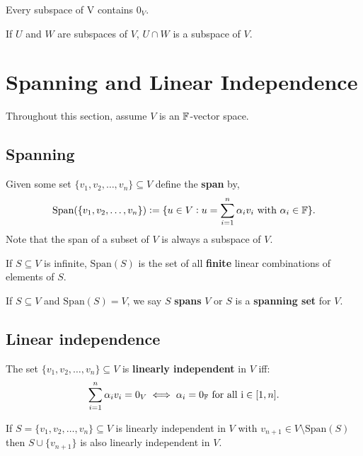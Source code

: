 \begin{theorem}
    Every subspace of V contains $0_V$.
\end{theorem}

\begin{theorem}
    If $U$ and $W$ are subspaces of $V$, $U\cap W$ is a subspace of $V$.
\end{theorem}

\section{Spanning and Linear Independence}
Throughout this section, assume $V$ is an $\mathbb{F}$-vector space.
\subsection{Spanning}
\begin{definition}[Span]
    Given some set $\{v_1,v_2,\ldots,v_n\}\subseteq V$ define the \textbf{span} by, \[
    \text{Span}(\{v_1,v_2,\ldots,v_n\}):=\{u\in V: u = \sum_{i=1}^n\alpha_i v_i \ \text{\textcolor{black}{ with }}\alpha_i\in\mathbb{F}\}\textcolor{black}{.}
    \]
    Note that the span of a subset of $V$ is always a subspace of $V$.
\end{definition}

\begin{remark}
    If $S\subseteq V$ is infinite, $\text{Span}(S)$ is the set of all \textbf{finite} linear combinations of elements of $S$.
\end{remark}

\begin{definition}
    If $S\subseteq V$ and $\text{Span}(S)=V$, we say $S$ \textbf{spans} $V$ or $S$ is a \textbf{spanning set} for $V$.
\end{definition}

\subsection{Linear independence}
\begin{definition}
    The set $\{v_1,v_2,\ldots,v_n\}\subseteq V$ is \textbf{linearly independent} in $V$ iff: \[
        \sum_{i=1}^n\alpha_i v_i = 0_V \iff \alpha_i=0_{\mathbb{F}} \ \text{\textcolor{black}{ for all }}\mathrm{i}\in[1,n]\textcolor{black}{.}
    \]
\end{definition}

\begin{theorem}
    If $S = \{v_1,v_2,\ldots,v_n\}\subseteq V$ is linearly independent in $V$ with $v_{n+1}\in V\setminus \text{Span}(S)$ then $S\cup\{v_{n+1}\}$ is also linearly independent in $V$. 
\end{theorem}

